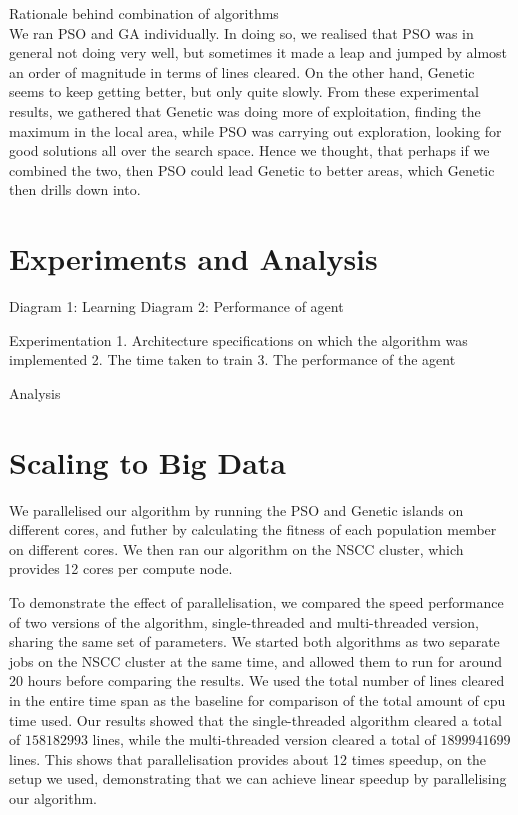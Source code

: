 \documentclass{article}
\begin{document}
	Rationale behind combination of algorithms\\
	We ran PSO and GA individually. In doing so, we realised that PSO was in general not doing
	very well, but sometimes it made a leap and jumped by almost an order of magnitude
	in terms of lines cleared. On the other hand, Genetic seems to keep getting
	better, but only quite slowly. From these experimental results, we gathered
	that Genetic was doing more of exploitation, finding the maximum in the local area,
	while PSO was carrying out exploration, looking for good solutions all over
	the search space. Hence we thought, that perhaps if we combined the two, then
	PSO could lead Genetic to better areas, which Genetic then drills down into.

    \section{Experiments and Analysis}

    Diagram 1: Learning
    Diagram 2: Performance of agent

    Experimentation
        1. Architecture specifications on which the algorithm was implemented
        2. The time taken to train
        3. The performance of the agent

    Analysis

    \section{Scaling to Big Data}
	We parallelised our algorithm by running the PSO and Genetic islands on different cores, and
	futher by calculating the fitness of each population member on different cores.
	We then ran our algorithm on the NSCC cluster, which provides 12 cores per
	compute node.

	To demonstrate the effect of parallelisation, we compared the speed performance
	of two versions of the algorithm, single-threaded and multi-threaded version,
	sharing the same set of parameters. We started both algorithms as two separate jobs
	on the NSCC cluster at the same time, and allowed them to run for around 20
	hours before comparing the results. We used the total number of lines cleared
	in the entire time span as the baseline for comparison of the total amount of
	cpu time used. Our results showed that the single-threaded algorithm cleared
	a total of $158182993$ lines, while the multi-threaded version cleared a total
	of $1899941699$ lines. This shows that parallelisation provides about 12 times speedup,
	on the setup we used, demonstrating that we can achieve linear speedup by parallelising
	our algorithm.
\end{document}

